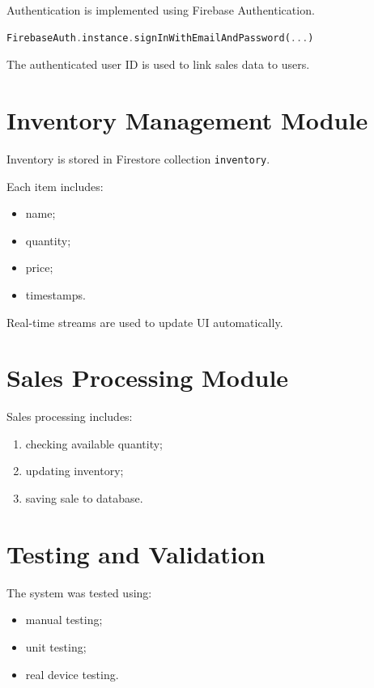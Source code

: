 Authentication is implemented using Firebase Authentication.

\begin{lstlisting}[language=Dart]
FirebaseAuth.instance.signInWithEmailAndPassword(...)
\end{lstlisting}

The authenticated user ID is used to link sales data to users.

\section{Inventory Management Module}

Inventory is stored in Firestore collection \texttt{inventory}.

Each item includes:
\begin{itemize}
    \item name;
    \item quantity;
    \item price;
    \item timestamps.
\end{itemize}

Real-time streams are used to update UI automatically.

\section{Sales Processing Module}

Sales processing includes:

\begin{enumerate}
    \item checking available quantity;
    \item updating inventory;
    \item saving sale to database.
\end{enumerate}

\section{Testing and Validation}

The system was tested using:

\begin{itemize}
    \item manual testing;
    \item unit testing;
    \item real device testing.
\end{itemize}

